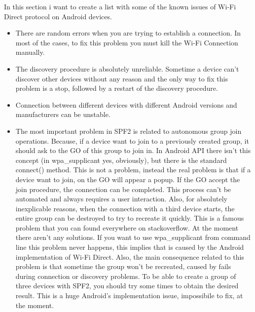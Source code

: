 In this section i want to create a list with some of the known issues of Wi-Fi Direct protocol on Android devices.
\begin{itemize}
	\item There are random errors when you are trying to establish a connection. In most of the cases, to fix this problem you must kill the Wi-Fi Connection manually.
	\item The discovery procedure is absolutely unreliable. Sometime a device can't discover other devices without any reason and the only way to fix this problem is a stop, followed by a restart of the discovery procedure.
	\item Connection between different devices with different Android versions and manufacturers can be unstable.
	\item The most important problem in SPF2 is related to autonomous group join operations. Because, if a device want to join to a previously created group, it should ask to the GO of this group to join in. In Android API there isn't this concept (in wpa\_supplicant yes, obviously), but there is the standard \textsf{connect()} method. This is not a problem, instead the real problem is that if a device want to join, on the GO will appear a popup. If the GO accept the join procedure, the connection can be completed. This process can't be automated and always requires a user interaction. Also, for absolutely inexplicable reasons, when the connection with a third device starts, the entire group can be destroyed to try to recreate it quickly. This is a famous problem that you can found everywhere on stackoverflow. At the moment there aren't any solutions. If you want to use wpa\_supplicant from command line this problem never happens, this implies that is caused by the Android implementation of Wi-Fi Direct. Also, the main consequence related to this problem is that sometime the group won't be recreated, caused by fails during connection or discovery problems. To be able to create a group of three devices with SPF2, you should try some times to obtain the desired result. This is a huge Android's implementation issue, impossibile to fix, at the moment.
\end{itemize}


